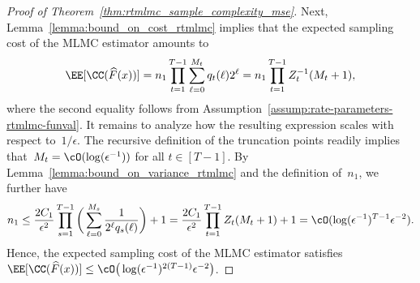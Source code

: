 \documentclass[11pt]{article}
\let\hat\widehat
\begin{document}
\begin{proof}[Proof of Theorem~\ref{thm:rtmlmc_sample_complexity_mse}]
Next, Lemma~\ref{lemma:bound_on_cost_rtmlmc} implies that the expected sampling cost of the MLMC estimator amounts to
\begin{align*}
    \EE[\CC(\hat{F}(x))] = n_1 \prod_{t=1}^{T-1} \sum_{\ell=0}^{M_t} q_t(\ell)2^{\ell} = n_1 \prod_{t=1}^{T-1} Z_t^{-1} (M_t+1), 
\end{align*}
where the second equality follows from 
Assumption~\ref{assump:rate-parameters-rtmlmc-funval}. It remains to analyze how the resulting expression scales with respect to~$1/\epsilon$. The recursive definition of the truncation points readily implies that~$M_t = \cO(\log(\epsilon^{-1}))$ for all $t \in [T-1]$. By Lemma~\ref{lemma:bound_on_variance_rtmlmc} and the definition of~$n_1$, we further have
\begin{align*}
    n_1\leq \frac{2C_1}{\epsilon^2} \prod_{s=1}^{T-1} \bigg(\sum_{\ell=0}^{M_s}\frac{1}{2^{\ell} q_s(\ell)} \bigg) +1 = \frac{2C_1}{\epsilon^2} \prod_{t=1}^{T-1}Z_t(M_t+1) +1 = \cO(\log(\epsilon^{-1})^{T-1}\epsilon^{-2}).
\end{align*}
Hence, the expected sampling cost of the MLMC estimator satisfies $\EE[\CC(\hat{F}(x))] \leq \cO\big(\log(\epsilon^{-1})^{2(T-1)}\epsilon^{-2}\big)$.



\end{proof}
\end{document}
